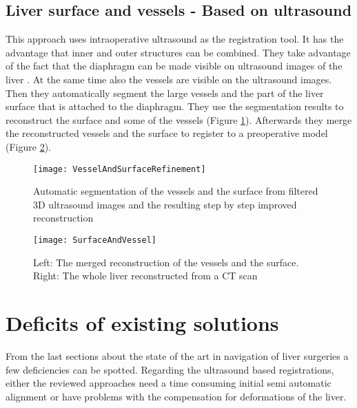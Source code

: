 \subsection{Liver surface and vessels - Based on ultrasound}
This approach uses intraoperative ultrasound as the registration tool. It has
the advantage that inner and outer structures can be combined. They take
advantage of the fact that the diaphragm can be made visible on ultrasound
images of the liver \cite{nam2011automatic}. At the same time also the vessels
are visible on the ultrasound images. Then they automatically segment the large
vessels and the part of the liver surface that is attached to the diaphragm.
They use the segmentation results to reconstruct the surface and some of the
vessels (Figure \ref{fig:VesselAndSurfaceRefinement}). Afterwards they merge the
reconstructed vessels and the surface to register to a preoperative model
(Figure \ref{fig:SurfaceAndVessel}).


\begin{figure}[H]
  \centering
 \texttt{[image: VesselAndSurfaceRefinement]}
 \caption{Automatic segmentation of the vessels and the surface from filtered 3D
   ultrasound images and the resulting step by step improved reconstruction \cite{nam2011automatic}}
  \label{fig:VesselAndSurfaceRefinement}
\end{figure}

\begin{figure}[H]
  \centering
 \texttt{[image: SurfaceAndVessel]}
 \caption{Left: The merged reconstruction of the vessels and the surface. Right:
   The whole liver reconstructed from a CT scan \cite{nam2011automatic}}
  \label{fig:SurfaceAndVessel}
\end{figure}




\section{Deficits of existing solutions}
From the last sections about the state of the art in navigation of liver
surgeries a few deficiencies  can be spotted. Regarding the ultrasound based
registrations, either the reviewed approaches
need a time consuming initial semi automatic alignment or have problems with the
compensation for deformations of the liver. 

